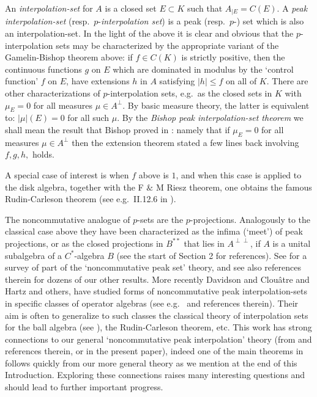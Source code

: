 \documentclass{amsart}
\theoremstyle{remark}
\theoremstyle{definition}
\numberwithin{equation}{section}
\begin{document}
An {\em interpolation-set} for $A$ is a closed set $E \subset K$ such that $A_{|E} = C(E)$.    A  {\em  peak interpolation-set} (resp.\ $p$-{\em interpolation set})
is a peak (resp.\ $p$-) set which is also an  interpolation-set.    In the light of the above it is clear and obvious that the $p$-interpolation sets may be characterized
by the appropriate variant of the Gamelin-Bishop theorem above: if  $f
\in C(K)$ is strictly positive, then the continuous functions  $g$ on $E$ which are dominated in modulus
by the `control function' $f$ on $E$, have extensions $h$ in $A$ satisfying $|h| \leq f$ on 
all of $K$.   There are other characterizations of $p$-interpolation sets, e.g.\ as the closed sets  in  
$K$ with $\mu_E =0$ for all measures $\mu \in A^\perp$.   By basic measure theory, 
the latter is equivalent to: $|\mu|(E) = 0$ for all such $\mu$.   
By the {\em Bishop peak interpolation-set theorem} we shall mean the result that Bishop proved in 
\cite{Bish}: namely that  if $\mu_E =0$ for all measures $\mu \in A^\perp$ then the extension theorem stated a few lines back involving $f, g,h,$ holds.


A special case of interest  is 
when $f$ above is $1$, and when this case  is applied to the 
disk algebra, together with the F $\&$ M Riesz theorem,  one obtains the famous Rudin-Carleson theorem
(see e.g.\ II.12.6 in \cite{Gam}).   

The noncommutative analogue of $p$-sets are the $p$-projections.   Analogously to the classical case above they have been characterized as 
the infima (`meet') of peak projections, or as the closed projections in $B^{**}$ that lies in $A^{\perp \perp}$, if $A$ is a unital subalgebra of a $C^*$-algebra $B$ (see the start of Section 2
for references).
See \cite{Bnpi} for a survey of part of the `noncommutative peak set'  theory, and see also references therein for dozens of our other results.  
More recently Davidson and Clou\^atre and Hartz and others, have studied forms of 
 noncommutative peak interpolation-sets in specific classes of operator algebras (see e.g.\ \cite{DH,CD,CD2,CT,CTh} and references therein).    Their aim is often to generalize to such classes the classical theory of interpolation sets 
 for the ball algebra (see \cite[Chapter 10]{Rudin}), the Rudin-Carleson theorem, etc.   This work has strong connections to our general `noncommutative peak interpolation' theory (from \cite{Bnpi} and references therein, or in the present paper), indeed one of the main theorems in \cite{DH} follows quickly from our more general theory as we mention at the end of this Introduction.
 Exploring these connections raises many interesting questions and should lead to further important progress.
 
\end{document}
